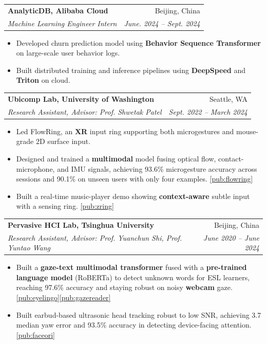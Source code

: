 \documentclass[letterpaper,11pt]{article}
\makeatletter
\newcommand{\resumeItem}[2]{
  \item\small{
    \textbf{#1}{#2 \vspace{-2pt}}
  }
}
\newcommand{\resumeSubheading}[5]{
  \vspace{-1pt}
  \item[]
    \begin{tabular*}{0.97\textwidth}{l@{\extracolsep{\fill}}r}
      \textbf{#1} & #2 \\
      \textit{\small#3} {\textbf{#5}} & \textit{\small #4} \\
    \end{tabular*}
    \vspace{-5pt}
}
\newcommand{\resumeItemListStart}{\begin{itemize}}
\newcommand{\resumeItemListEnd}{\end{itemize}\vspace{-5pt}}
\newcommand{\pubref}[2]{\href{#2}{\ref*{#1}}}
\makeatother
\begin{document}
    \resumeSubheading
      {AnalyticDB, Alibaba Cloud}{Beijing, China}
      {Machine Learning Engineer Intern}{June. 2024 – Sept. 2024}{}
      \resumeItemListStart
        \resumeItem{}
          {Developed churn prediction model using \textbf{Behavior Sequence Transformer} on large-scale user behavior logs.}
        \resumeItem{}
          {Built distributed training and inference pipelines using \textbf{DeepSpeed} and \textbf{Triton} on cloud.
          }
      \resumeItemListEnd
      
  \resumeSubheading
      {Ubicomp Lab, University of Washington}{Seattle, WA}
      {Research Assistant, Advisor: Prof. Shwetak Patel}{Sept. 2022 – March 2024}{}
      \resumeItemListStart
        \resumeItem{}
          {Led FlowRing, an \textbf{XR} input ring supporting both microgestures and mouse-grade 2D surface input.}
        \resumeItem{}
          {Designed and trained a \textbf{multimodal} model fusing optical flow, contact-microphone, and IMU signals, achieving 93.6\% microgesture accuracy across sessions and 90.1\% on unseen users with only four examples. \pubref{pub:flowring}{https://dl.acm.org/doi/full/10.1145/3743706}}
        \resumeItem{}
          {Built a real-time music-player demo showing \textbf{context-aware} subtle input with a sensing ring. \pubref{pub:zring}{https://dl.acm.org/doi/10.1145/3586182.3615809}}
      \resumeItemListEnd

    \resumeSubheading
      {Pervasive HCI Lab, Tsinghua University}{Beijing, China}
      {Research Assistant, Advisor: Prof. Yuanchun Shi, Prof. Yuntao Wang}{June 2020 – June 2024}{}
      \resumeItemListStart
        \resumeItem{}
          {Built a \textbf{gaze-text multimodal transformer} fused with a \textbf{pre-trained language model} (RoBERTa) to detect unknown words for ESL learners, reaching 97.6\% accuracy and staying robust on noisy \textbf{webcam} gaze. \pubref{pub:eyelingo}{https://dl.acm.org/doi/full/10.1145/3706598.3714181}\pubref{pub:gazereader}{https://dl.acm.org/doi/10.1145/3544549.3585790}}
        \resumeItem{}
          {Built earbud-based ultrasonic head tracking robust to low SNR, achieving 3.7\textdegree{} median yaw error and 93.5\% accuracy in detecting device-facing attention. \pubref{pub:faceori}{https://dl.acm.org/doi/10.1145/3491102.3517698}}
      \resumeItemListEnd
\end{document}
